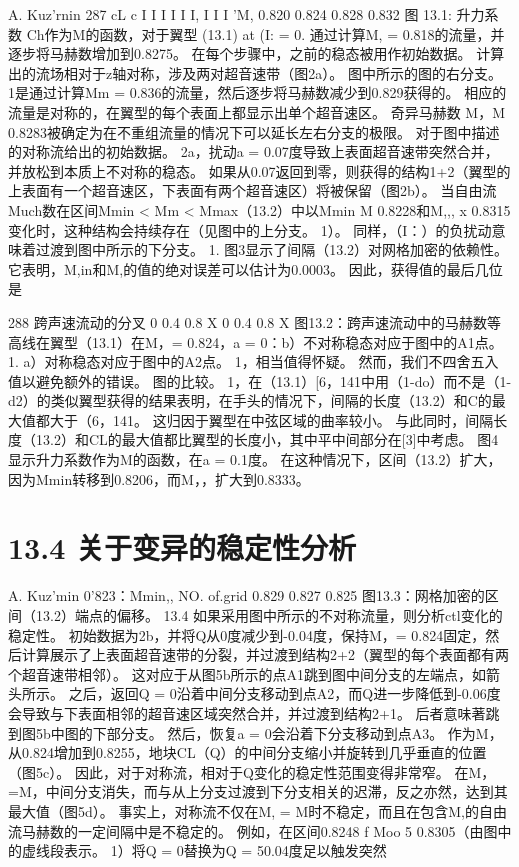 \documentclass[UTF8,11pt,a4paper,openany,fontset=fandol]{ctexbook}
\begin{document}
A. Kuz'rnin 287 cL c I I I I I I, I I I 'M, 0.820 0.824 0.828 0.832 图 13.1: 升力系数 Ch作为M的函数，对于翼型 (13.1) at (I: = 0. 通过计算M, = 0.818的流量，并逐步将马赫数增加到0.8275。 在每个步骤中，之前的稳态被用作初始数据。 计算出的流场相对于z轴对称，涉及两对超音速带（图2a）。 图中所示的图的右分支。 1是通过计算Mm = 0.836的流量，然后逐步将马赫数减少到0.829获得的。 相应的流量是对称的，在翼型的每个表面上都显示出单个超音速区。 奇异马赫数 M，M 0.8283被确定为在不重组流量的情况下可以延长左右分支的极限。 对于图中描述的对称流给出的初始数据。 2a，扰动a = 0.07度导致上表面超音速带突然合并，并放松到本质上不对称的稳态。 如果从0.07返回到零，则获得的结构1+2（翼型的上表面有一个超音速区，下表面有两个超音速区）将被保留（图2b）。 当自由流Much数在区间Mmin < Mm < Mmax（13.2）中以Mmin M 0.8228和M,,, x 0.8315变化时，这种结构会持续存在（见图中的上分支。 1）。 同样，（I：）的负扰动意味着过渡到图中所示的下分支。 1. 图3显示了间隔（13.2）对网格加密的依赖性。 它表明，M,in和M,的值的绝对误差可以估计为0.0003。 因此，获得值的最后几位是

288 跨声速流动的分叉 0 0.4 0.8 X 0 0.4 0.8 X 图13.2：跨声速流动中的马赫数等高线在翼型（13.1）在M，= 0.824，a = 0：b）不对称稳态对应于图中的A1点。 1. a）对称稳态对应于图中的A2点。 1，相当值得怀疑。 然而，我们不四舍五入值以避免额外的错误。 图的比较。 1，在（13.1）[6，141中用（1-do）而不是（1-d2）的类似翼型获得的结果表明，在手头的情况下，间隔的长度（13.2）和C的最大值都大于（6，141。 这归因于翼型在中弦区域的曲率较小。 与此同时，间隔长度（13.2）和CL的最大值都比翼型的长度小，其中平中间部分在[3]中考虑。 图4显示升力系数作为M的函数，在a = 0.1度。 在这种情况下，区间（13.2）扩大，因为Mmin转移到0.8206，而M，，扩大到0.8333。

\section{13.4 关于变异的稳定性分析}
A. Kuz'min 0'823：Mmin,, NO. of.grid 0.829 0.827 0.825 图13.3：网格加密的区间（13.2）端点的偏移。 13.4 如果采用图中所示的不对称流量，则分析ctl变化的稳定性。 初始数据为2b，并将Q从0度减少到-0.04度，保持M，= 0.824固定，然后计算展示了上表面超音速带的分裂，并过渡到结构2+2（翼型的每个表面都有两个超音速带相邻）。 这对应于从图5b所示的点A1跳到图中间分支的左端点，如箭头所示。 之后，返回Q = 0沿着中间分支移动到点A2，而Q进一步降低到-0.06度会导致与下表面相邻的超音速区域突然合并，并过渡到结构2+1。 后者意味著跳到图5b中图的下部分支。 然后，恢复a = 0会沿着下分支移动到点A3。 作为M，从0.824增加到0.8255，地块CL（Q）的中间分支缩小并旋转到几乎垂直的位置（图5c）。 因此，对于对称流，相对于Q变化的稳定性范围变得非常窄。 在M，=M，中间分支消失，而与从上分支过渡到下分支相关的迟滞，反之亦然，达到其最大值（图5d）。 事实上，对称流不仅在M, = M时不稳定，而且在包含M,的自由流马赫数的一定间隔中是不稳定的。 例如，在区间0.8248 f Moo 5 0.8305（由图中的虚线段表示。 1）将Q = 0替换为Q = 50.04度足以触发突然
\end{document}
